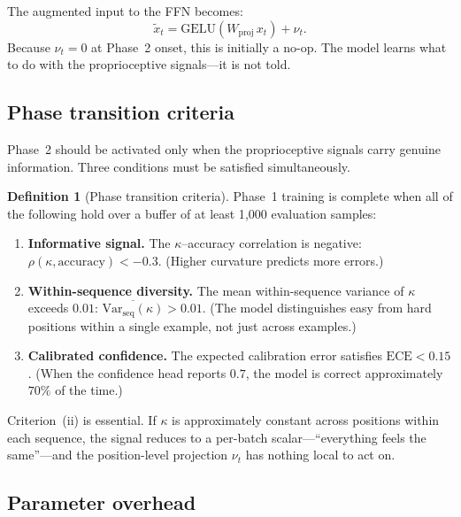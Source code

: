 \documentclass[11pt,a4paper]{article}
\theoremstyle{definition}
\newtheorem{definition}[theorem]{Definition}
\theoremstyle{remark}
\begin{document}
The augmented input to the FFN becomes:
\begin{equation}\label{eq:augmented_input}
    \tilde{x}_t = \mathrm{GELU}(W_{\mathrm{proj}}\,x_t) + \nu_t.
\end{equation}
Because $\nu_t = 0$ at Phase~2 onset, this is initially a no-op. The 
model learns what to do with the proprioceptive signals---it is not 
told.

\subsection{Phase transition criteria}\label{sec:proprio_transition}

Phase~2 should be activated only when the proprioceptive signals 
carry genuine information. Three conditions must be satisfied 
simultaneously.

\begin{definition}[Phase transition criteria]
\label{def:phase_transition}
Phase~1 training is complete when all of the following hold over 
a buffer of at least 1{,}000 evaluation samples:
\begin{enumerate}[label=(\roman*),nosep]
    \item \textbf{Informative signal.} The $\kappa$--accuracy 
    correlation is negative: 
    $\rho(\kappa, \mathrm{accuracy}) < -0.3$. 
    (Higher curvature predicts more errors.)
    
    \item \textbf{Within-sequence diversity.} The mean 
    within-sequence variance of $\kappa$ exceeds $0.01$:
    $\overline{\mathrm{Var}_{\mathrm{seq}}(\kappa)} > 0.01$. 
    (The model distinguishes easy from hard positions within 
    a single example, not just across examples.)
    
    \item \textbf{Calibrated confidence.} The expected calibration 
    error satisfies $\mathrm{ECE} < 0.15$. (When the confidence 
    head reports $0.7$, the model is correct approximately $70\%$ 
    of the time.)
\end{enumerate}
\end{definition}

Criterion~(ii) is essential. If $\kappa$ is approximately constant 
across positions within each sequence, the signal reduces to a 
per-batch scalar---``everything feels the same''---and the 
position-level projection $\nu_t$ has nothing local to act on.

\subsection{Parameter overhead}\label{sec:proprio_overhead}
\end{document}

